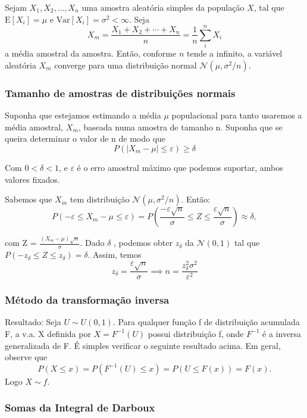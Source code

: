 \documentclass{article}
\begin{document}
Sejam $X_1, X_2, \ldots, X_n$ uma amostra aleatória simples da população $X$, tal que $\text{E}[X_i] = \mu$ e $\text{Var}[X_i] = \sigma^2 < \infty$. Seja
\[
X_m = \frac{X_1 + X_2 + \cdots + X_n}{n}
      = \frac{1}{n}\sum_{i}^{n} X_i
\]
a média amostral da amostra. Então, conforme $n$ tende a infinito, a variável aleatória $X_m$ converge para uma distribuição normal $\mathcal{N}(\mu, \sigma^2/n)$.

\subsubsection{Tamanho de amostras de distribuições normais}

Suponha que estejamos estimando a média $\mu$ populacional para tanto usaremos a média amostral, $X_m$, baseada numa amostra de tamanho n. Suponha
que se queira determinar o valor de n de modo que 
\[
P(|X_m - \mu| \leq \varepsilon) \geq \delta 
\] 

Com $0 < \delta < 1$, e $\varepsilon$ é o erro amostral máximo que podemos suportar, ambos valores fixados.

Sabemos que $X_m$ tem distribuição $\mathcal{N}(\mu, \sigma^2/n)$. Então:
\[
P(-\varepsilon \leq X_m - \mu \leq \varepsilon) = P(\frac{-\varepsilon \sqrt{n}}{\sigma} \leq Z \leq \frac{\varepsilon \sqrt{n}}{\sigma} ) \approx \delta ,  \]

com Z = $\frac{(X_m - \mu)\sqrt{n}}{\sigma} $.
Dado $\delta$ , podemos obter $z_\delta$ da $\mathcal{N}(0,1)$ tal que $P(-z_\delta \leq Z \leq z_\delta)=\delta$. Assim, temos
\begin{equation}
   z_\delta = \frac{\varepsilon \sqrt{n}}{\sigma} \implies
n = \frac{z_\delta^2 \sigma^2}{\varepsilon^2}
\end{equation}

\subsubsection{Método da transformação inversa}
Resultado: Seja $U \sim U(0,1).$ Para qualquer função f de distribuição acumulada F, a v.a. X definida por
$X=F^{-1} (U)$
possui distribuição f, onde $F^{-1}$ é a inversa generalizada de F.
É simples verificar o seguinte resultado acima. Em geral, observe que
\[
P(X \leq x)= P(F^{-1} (U) \leq x)= P(U \leq F(x)) = F(x).
\]
Logo $X \sim f$.
\subsubsection{Somas da Integral de Darboux}
\end{document}
